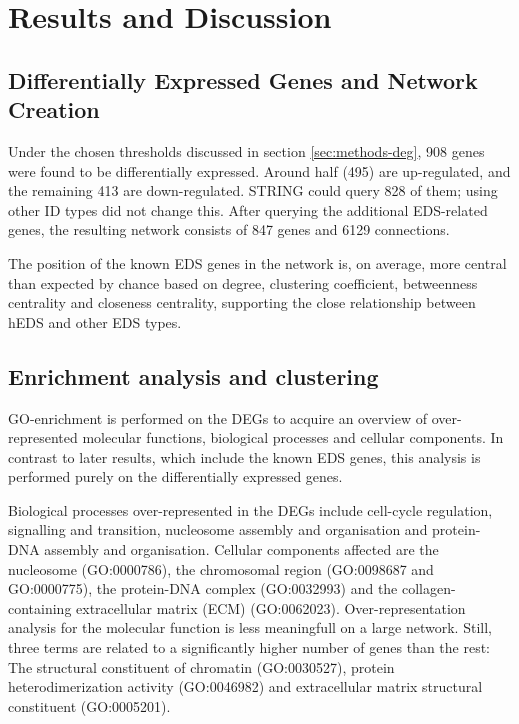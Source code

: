 \section{Results and Discussion}
\subsection{Differentially Expressed Genes and Network Creation}

Under the chosen thresholds discussed in section \ref{sec:methods-deg}, 908 genes were found to be differentially expressed. Around half (495) are up-regulated, and the remaining 413 are down-regulated. STRING could query 828 of them; using other ID types did not change this. After querying the additional EDS-related genes, the resulting network consists of 847 genes and 6129 connections.

The position of the known EDS genes in the network is, on average, more central than expected by chance based on degree, clustering coefficient, betweenness centrality and closeness centrality, supporting the close relationship between hEDS and other EDS types.

\subsection{Enrichment analysis and clustering}

GO-enrichment is performed on the DEGs to acquire an overview of over-represented molecular functions, biological processes and cellular components. In contrast to later results, which include the known EDS genes, this analysis is performed purely on the differentially expressed genes.

Biological processes over-represented in the DEGs include cell-cycle regulation, signalling and transition, nucleosome assembly and organisation and protein-DNA assembly and organisation.  Cellular components affected are the nucleosome (GO:0000786), the chromosomal region (GO:0098687 and GO:0000775), the protein-DNA complex (GO:0032993) and the collagen-containing extracellular matrix (ECM) (GO:0062023). Over-representation analysis for the molecular function is less meaningfull on a large network. Still, three terms are related to a significantly higher number of genes than the rest: The structural constituent of chromatin (GO:0030527), protein heterodimerization activity (GO:0046982) and extracellular matrix structural constituent (GO:0005201).

